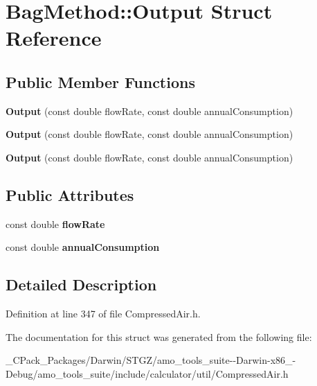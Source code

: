 \hypertarget{struct_bag_method_1_1_output}{}\section{Bag\+Method\+:\+:Output Struct Reference}
\label{struct_bag_method_1_1_output}
\subsection*{Public Member Functions}
\begin{DoxyCompactItemize}
\item 
\mbox{\label{struct_bag_method_1_1_output_a32476edc4a2b924580f0976732cb9aa0}} 
{\bfseries Output} (const double flow\+Rate, const double annual\+Consumption)
\item 
\mbox{\label{struct_bag_method_1_1_output_a32476edc4a2b924580f0976732cb9aa0}} 
{\bfseries Output} (const double flow\+Rate, const double annual\+Consumption)
\item 
\mbox{\label{struct_bag_method_1_1_output_a32476edc4a2b924580f0976732cb9aa0}} 
{\bfseries Output} (const double flow\+Rate, const double annual\+Consumption)
\end{DoxyCompactItemize}
\subsection*{Public Attributes}
\begin{DoxyCompactItemize}
\item 
\mbox{\label{struct_bag_method_1_1_output_a6625c932cfa3935a7198b8ed1747955f}} 
const double {\bfseries flow\+Rate}
\item 
\mbox{\label{struct_bag_method_1_1_output_ae287da01450815f1cc6d22b39944482a}} 
const double {\bfseries annual\+Consumption}
\end{DoxyCompactItemize}


\subsection{Detailed Description}


Definition at line 347 of file Compressed\+Air.\+h.



The documentation for this struct was generated from the following file\+:\begin{DoxyCompactItemize}
\item 
\+\_\+\+C\+Pack\+\_\+\+Packages/\+Darwin/\+S\+T\+G\+Z/amo\+\_\+tools\+\_\+suite-\/-\/\+Darwin-\/x86\+\_-\/\+Debug/amo\+\_\+tools\+\_\+suite/include/calculator/util/Compressed\+Air.\+h\end{DoxyCompactItemize}
